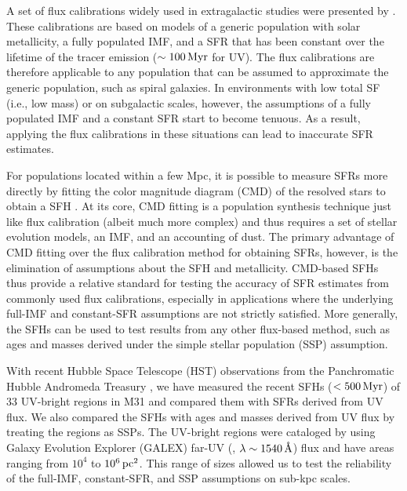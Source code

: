 A set of flux calibrations widely used in extragalactic studies were presented
by \citet[][see \citealp{Kennicutt:2012} for updates]{Kennicutt:1998}. These
calibrations are based on models of a generic population with solar
metallicity, a fully populated IMF, and a SFR that has been constant over the
lifetime of the tracer emission ($\sim 100\,\mathrm{Myr}$ for UV). The flux calibrations
are therefore applicable to any population that can be assumed to approximate
the generic population, such as spiral galaxies. In environments with low total
SF (i.e., low mass) or on subgalactic scales, however, the assumptions of a
fully populated IMF and a constant SFR start to become tenuous. As a result,
applying the flux calibrations in these situations can lead to inaccurate SFR
estimates.

For populations located within a few Mpc, it is possible to measure SFRs more
directly by fitting the color magnitude diagram (CMD) of the resolved stars to
obtain a SFH \citep{Dolphin:2002}. At its core, CMD fitting is a population
synthesis technique just like flux calibration (albeit much more complex) and
thus requires a set of stellar evolution models, an IMF, and an accounting of
dust. The primary advantage of CMD fitting over the flux calibration method for
obtaining SFRs, however, is the elimination of assumptions about the SFH and
metallicity. CMD-based SFHs thus provide a relative standard for testing the
accuracy of SFR estimates from commonly used flux calibrations, especially in
applications where the underlying full-IMF and constant-SFR assumptions are not
strictly satisfied. More generally, the SFHs can be used to test results from
any other flux-based method, such as ages and masses derived under the simple
stellar population (SSP) assumption.

With recent Hubble Space Telescope (HST) observations from the Panchromatic
Hubble Andromeda Treasury \citep[PHAT;][]{Dalcanton:2012}, we have measured the
recent SFHs ($< 500\,\mathrm{Myr}$) of 33 UV-bright regions in M31 and compared
them with SFRs derived from UV flux. We also compared the SFHs with ages and
masses derived from UV flux by treating the regions as SSPs. The UV-bright
regions were cataloged by \citet[][ hereafter]{Kang:2009} using
Galaxy Evolution Explorer (GALEX) far-UV (\fuv{}, $\lambda \sim
1540\,\textrm{\AA}$) flux and have areas ranging from $10^4$ to
$10^6\,\mathrm{pc}^2$. This range of sizes allowed us to test the reliability
of the full-IMF, constant-SFR, and SSP assumptions on sub-kpc scales.

